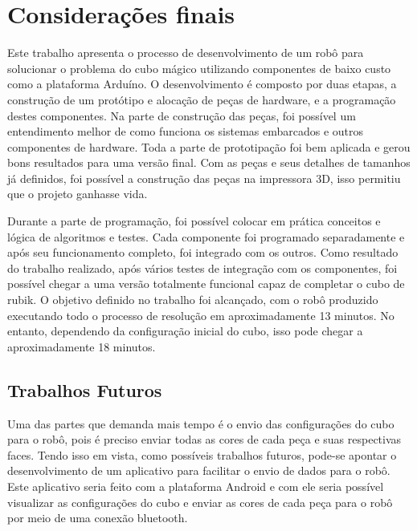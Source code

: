 \chapter{Considerações finais}
   
   Este trabalho apresenta o processo de desenvolvimento de um robô para solucionar o problema do cubo mágico utilizando componentes de baixo custo como a plataforma Arduíno. O desenvolvimento é composto por duas etapas, a construção de um protótipo e alocação de peças de hardware, e a programação destes componentes. Na parte de construção das peças, foi possível um entendimento melhor de como funciona os sistemas embarcados e outros componentes de hardware. Toda a parte de prototipação foi bem aplicada e gerou bons resultados para uma versão final. Com as peças e seus detalhes de tamanhos já definidos, foi possível a construção das peças na impressora 3D, isso permitiu que o projeto ganhasse vida. 
  
   
   Durante a parte de programação, foi possível colocar em prática conceitos e lógica de algoritmos e testes. Cada componente foi programado separadamente e após seu funcionamento completo, foi integrado com os outros. Como resultado do trabalho realizado, após vários testes de integração com os componentes, foi possível chegar a uma versão totalmente funcional capaz de completar o cubo de rubik. O objetivo definido no trabalho foi alcançado, com o robô produzido executando todo o processo de resolução em aproximadamente 13 minutos. No entanto, dependendo da configuração inicial do cubo, isso pode chegar a aproximadamente 18 minutos.
   
   
\section{Trabalhos Futuros}



    Uma das partes que demanda mais tempo é o envio das configurações do cubo para o robô, pois é preciso enviar todas as cores de cada peça e suas respectivas faces. Tendo isso em vista, como possíveis trabalhos futuros, pode-se apontar o desenvolvimento de um aplicativo para facilitar o envio de dados para o robô. Este aplicativo seria feito com a plataforma Android e com ele seria possível visualizar as configurações do cubo e enviar as cores de cada peça para o robô por meio de uma conexão bluetooth. 
   
   
   
   
